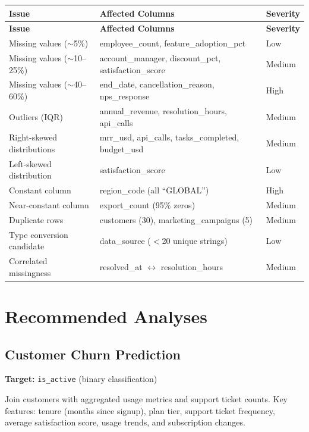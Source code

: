 \documentclass[11pt,a4paper]{article}
\begin{document}
\begin{center}
\begin{longtable}{lll}
    \toprule
    \textbf{Issue} & \textbf{Affected Columns} & \textbf{Severity} \\
    \midrule
    \endfirsthead
    \toprule
    \textbf{Issue} & \textbf{Affected Columns} & \textbf{Severity} \\
    \midrule
    \endhead
    Missing values ($\sim$5\%)    & employee\_count, feature\_adoption\_pct & Low \\
    Missing values ($\sim$10--25\%) & account\_manager, discount\_pct, satisfaction\_score & Medium \\
    Missing values ($\sim$40--60\%) & end\_date, cancellation\_reason, nps\_response & High \\
    Outliers (IQR)              & annual\_revenue, resolution\_hours, api\_calls & Medium \\
    Right-skewed distributions  & mrr\_usd, api\_calls, tasks\_completed, budget\_usd & Medium \\
    Left-skewed distribution    & satisfaction\_score & Low \\
    Constant column             & region\_code (all ``GLOBAL'') & High \\
    Near-constant column        & export\_count (95\% zeros) & Medium \\
    Duplicate rows              & customers (30), marketing\_campaigns (5) & Medium \\
    Type conversion candidate   & data\_source ($<$20 unique strings) & Low \\
    Correlated missingness      & resolved\_at $\leftrightarrow$ resolution\_hours & Medium \\
    \bottomrule
\end{longtable}
\end{center}

\section{Recommended Analyses}

\subsection{Customer Churn Prediction}

\textbf{Target:} \texttt{is\_active} (binary classification)

Join customers with aggregated usage metrics and support ticket counts.
Key features: tenure (months since signup), plan tier, support ticket frequency,
average satisfaction score, usage trends, and subscription changes.
\end{document}

